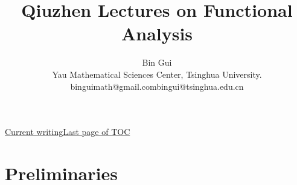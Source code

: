 \documentclass[12pt,b5paper,notitlepage]{article}
\title{Qiuzhen Lectures on Functional Analysis}
\author{{\sc Bin Gui}
	\\
	{\small \sc Yau Mathematical Sciences Center, Tsinghua University.}\\
	{\small binguimath@gmail.com\qquad bingui@tsinghua.edu.cn}
}
\theoremstyle{definition}
\theoremstyle{plain}
\numberwithin{equation}{section}
\begin{document}
\sloppy %
	\setcounter{page}{1}



	









	
	\maketitle
\small   
\qquad 

\hyperlink{current}{Current writing}\qquad \hyperlink{page.2}{Last page of TOC}











	


\normalsize
\tableofcontents






\newpage



\section{Preliminaries}
\end{document}
